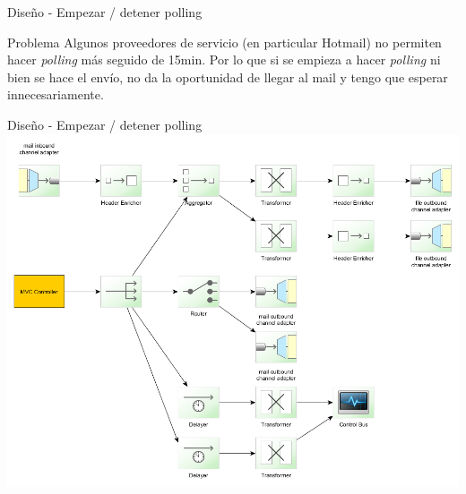 \documentclass{beamer}
\begin{document}
\begin{frame}{Diseño - Empezar / detener polling}
\begin{block}{Problema}
Algunos proveedores de servicio (en particular Hotmail) no permiten hacer \textit{polling} más seguido de 15min. Por lo que si se empieza a hacer \textit{polling} ni bien se hace el envío, no da la oportunidad de llegar al mail y tengo que esperar innecesariamente.
\end{block}
\end{frame}

\begin{frame}{Diseño - Empezar / detener polling}
\includegraphics[width=0.8\linewidth]{sp-int-15}
\end{frame}
\end{document}
